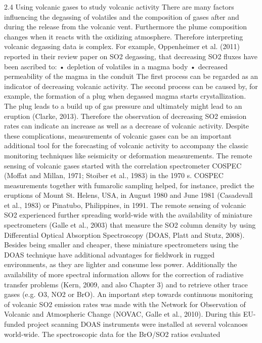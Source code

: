 \documentclass  [
  paper    = a4,
  BCOR     = 10mm,
  twoside,
  fontsize = 12pt,
  fleqn,
  toc      = bibnumbered,
  toc      = listofnumbered,
  numbers  = noendperiod,
  headings = normal,
  listof   = leveldown,
  version  = 3.03
]                                       {scrreprt}
\begin{document}
	2.4 Using volcanic gases to study volcanic activity
	There are many factors influencing the degassing of volatiles and the composition
	of gases after and during the release from the volcanic vent. Furthermore the
	plume composition changes when it reacts with the oxidizing atmosphere. Therefore
	interpreting volcanic degassing data is complex. For example, Oppenheimer
	et al. (2011) reported in their review paper on SO2 degassing, that decreasing
	SO2 fluxes have been ascribed to:
	• depletion of volatiles in a magma body
	• decreased permeability of the magma in the conduit
	The first process can be regarded as an indicator of decreasing volcanic activity.
	The second process can be caused by, for example, the formation of a plug when
	degassed magma starts crystallization. The plug leads to a build up of gas
	pressure and ultimately might lead to an eruption (Clarke, 2013). Therefore the
	observation of decreasing SO2 emission rates can indicate an increase as well as
	a decrease of volcanic activity.
	Despite these complications, measurements of volcanic gases can be an important
	additional tool for the forecasting of volcanic activity to accompany
	the classic monitoring techniques like seismicity or deformation measurements.
	The remote sensing of volcanic gases started with the correlation spectrometer
	COSPEC (Moffat and Millan, 1971; Stoiber et al., 1983) in the 1970 s. COSPEC 
	measurements together with fumarolic sampling helped, for instance, predict the
	eruptions of Mount St. Helens, USA, in August 1980 and June 1981 (Casadevall
	et al., 1983) or Pinatubo, Philippines, in 1991. The remote sensing of volcanic
	SO2 experienced further spreading world-wide with the availability of miniature
	spectrometers (Galle et al., 2003) that measure the SO2 column density by
	using Differential Optical Absorption Spectroscopy (DOAS, Platt and Stutz,
	2008). Besides being smaller and cheaper, these miniature spectrometers using
	the DOAS technique have additional advantages for fieldwork in rugged
	environments, as they are lighter and consume less power. Additionally the
	availability of more spectral information allows for the correction of radiative
	transfer problems (Kern, 2009, and also Chapter 3) and to retrieve other trace
	gases (e.g. O3, NO2 or BrO). An important step towards continuous monitoring
	of volcanic SO2 emission rates was made with the Network for Observation
	of Volcanic and Atmospheric Change (NOVAC, Galle et al., 2010). During
	this EU-funded project scanning DOAS instruments were installed at several
	volcanoes world-wide. The spectroscopic data for the BrO/SO2 ratios evaluated
\end{document}

